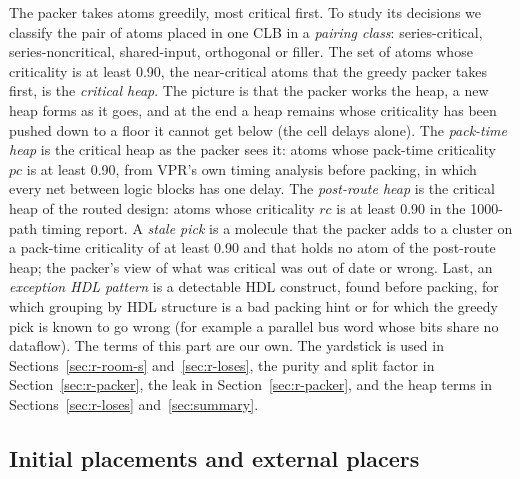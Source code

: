 The packer takes atoms greedily, most critical first. To study its decisions we classify the pair of atoms placed in one CLB in a \emph{pairing class}: series-critical, series-noncritical, shared-input, orthogonal or filler. %
The set of atoms whose criticality is at least 0.90, the near-critical atoms that the greedy packer takes first, is the \emph{critical heap}. %
The picture is that the packer works the heap, a new heap forms as it goes, and at the end a heap remains whose criticality has been pushed down to a floor it cannot get below (the cell delays alone).
The \emph{pack-time heap} is the critical heap as the packer sees it: atoms whose pack-time criticality $pc$ is at least 0.90, from VPR's own timing analysis before packing, in which every net between logic blocks has one delay. %
The \emph{post-route heap} is the critical heap of the routed design: atoms whose criticality $rc$ is at least 0.90 in the 1000-path timing report. %
A \emph{stale pick} is a molecule that the packer adds to a cluster on a pack-time criticality of at least 0.90 and that holds no atom of the post-route heap; the packer's view of what was critical was out of date or wrong. %
Last, an \emph{exception HDL pattern} is a detectable HDL construct, found before packing, for which grouping by HDL structure is a bad packing hint or for which the greedy pick is known to go wrong (for example a parallel bus word whose bits share no dataflow). %
The terms of this part are our own. The yardstick is used in Sections~\ref{sec:r-room-s} and~\ref{sec:r-loses}, the purity and split factor in Section~\ref{sec:r-packer}, the leak in Section~\ref{sec:r-packer}, and the heap terms in Sections~\ref{sec:r-loses} and~\ref{sec:summary}.

\subsection{Initial placements and external placers}

